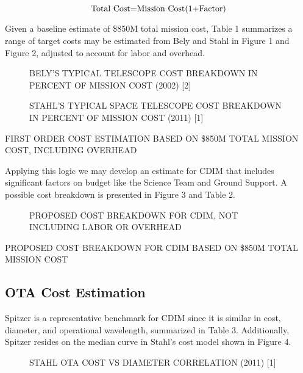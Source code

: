 \documentclass{ws-jai}
\begin{document}
\begin{equation}
  	$Total Cost$=$Mission Cost$ (1+$Factor$)
\end{equation}

Given a baseline estimate of \$850M total mission cost, Table 1 summarizes a range of target costs may be estimated from Bely and Stahl in Figure 1 and Figure 2, adjusted to account for labor and overhead.

\begin{figure}
  \caption{BELY'S TYPICAL TELESCOPE COST BREAKDOWN IN PERCENT OF MISSION COST (2002) [2]
\label{fig:bely-cost}
}
\end{figure}

\begin{figure}
  \caption{STAHL'S TYPICAL SPACE TELESCOPE COST BREAKDOWN IN PERCENT OF MISSION COST (2011) [1]
\label{fig:stahl-mission-cost}
}
\end{figure}

\begin{table}
  \caption{FIRST ORDER COST ESTIMATION BASED ON \$850M TOTAL MISSION COST, INCLUDING OVERHEAD
\label{tab:first-order-cost-estimate}
}
\end{table}

Applying this logic we may develop an estimate for CDIM that includes significant factors on budget like the Science Team and Ground Support.
A possible cost breakdown is presented in Figure 3 and Table 2.

\begin{figure}
  \caption{PROPOSED COST BREAKDOWN FOR CDIM, NOT INCLUDING LABOR OR OVERHEAD
\label{fig:cost-no-overhead}
}
\end{figure}

\begin{table}
  \caption{PROPOSED COST BREAKDOWN FOR CDIM BASED ON \$850M TOTAL MISSION COST
\label{tab:cost-from-total-mission}
}
\end{table}

\subsection{OTA Cost Estimation}
Spitzer is a representative benchmark for CDIM since it is similar in cost, diameter, and operational wavelength, summarized in Table 3.
Additionally, Spitzer resides on the median curve in Stahl's cost model shown in Figure 4.

\begin{figure}
  \caption{STAHL OTA COST VS DIAMETER CORRELATION (2011) [1]
\label{fig:cost-stahl-ota-cost-vs-diameter}
}
\end{figure}
\end{document}
